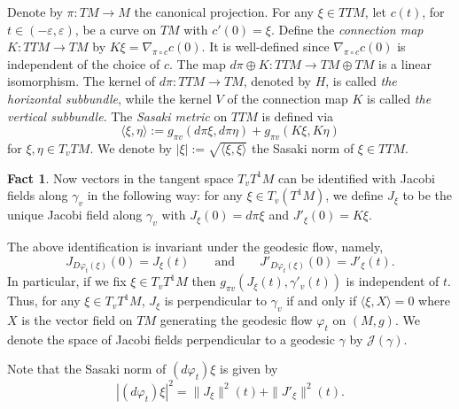 \documentclass[JEP,XML,SOM,Unicode,NoFloatCountersInSection]{cedram}
\theoremstyle{definition}
\newtheorem{fact}[theorem]{Fact}
\let\phi\varphi
\let\eps\varepsilon
\renewcommand{\>}{{\rangle}}
\newcommand{\<}{{\langle}}
\begin{document}
Denote by $\pi: TM\to M$ the canonical projection. For any $\xi\in TTM$, let $c(t)$, for $t\in(-\eps,\eps)$, be a curve on $TM$ with $c'(0)=\xi$. Define the {\it connection map $K: TTM\to TM$} by $K\xi=\nabla_{\pi\circ c}c(0)$. It is well-defined since $\nabla_{\pi\circ c}c(0)$ is independent of the choice of $c$. The map $d\pi\oplus K: TTM\to TM\oplus TM$ is a linear isomorphism. The kernel of $d\pi: TTM\to TM$, denoted by $H$, is called {\it the horizontal subbundle}, while the kernel $V$ of the connection map $K$ is called {\it the vertical subbundle}. The {\it Sasaki metric} on $TTM$ is defined via
\[
\langle \xi, \eta\rangle:=g_{\pi v} (d\pi \xi, d\pi\eta)+g_{\pi v} (K\xi, K\eta)
\]
for $\xi,\eta\in T_vTM$. We denote by $|\xi|:=\sqrt{\langle \xi, \xi\rangle}$ the Sasaki norm of $\xi\in TTM$.

\begin{fact}\label{identification_Jacobi}
Now vectors in the tangent space $T_vT^1M$ can be identified with Jacobi fields along $\gamma_v$ in the following way: for any $\xi\in T_v(T^1M)$, we define $J_{\xi}$ to be the unique Jacobi field along $\gamma_v$ with $J_{\xi}(0)=d\pi\xi$ and $J'_{\xi}(0)=K\xi$.
\end{fact}

The above identification is invariant under the geodesic flow, namely,
\begin{equation*}
J_{D\phi_t(\xi)}(0)=J_{\xi}(t)\qquad \text{and} \qquad J'_{D\phi_t(\xi)}(0)=J'_{\xi}(t).
\end{equation*}
In particular, if we fix $\xi\in T_vT^1M$ then $g_{\pi v} (J_{\xi}(t), \gamma'_v(t))$ is independent of $t$. Thus, for any $\xi\in T_vT^1M$, $J_{\xi}$ is perpendicular to $\gamma_v$ if and only if $\langle\xi, X\rangle=0$ where $X$ is the vector field on $TM$ generating the geodesic flow $\phi_t$ on $(M,g)$. We denote the space of Jacobi fields perpendicular to a geodesic $\gamma$ by $\mathcal J(\gamma)$.

Note that the Sasaki norm of $(d\phi_t)\xi$ is given by
\begin{equation}\label{eq: sasaki_jacobi}
|(d\phi_t)\xi|^2=\|J_{\xi}\|^2(t)+\|J'_{\xi}\|^2(t).
\end{equation}
\end{document}
